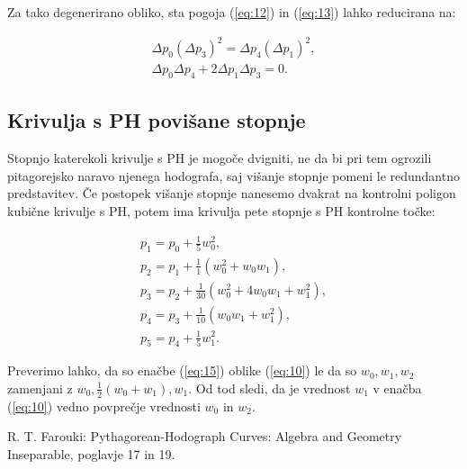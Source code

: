 \documentclass[a4paper]{IEEEtran}
\begin{document}
	Za tako degenerirano obliko, sta pogoja (\ref{eq:12}) in (\ref{eq:13}) lahko reducirana na:
	
	\begin{eqnarray}
	\Delta p_0(\Delta p_3)^2 =\Delta p_4(\Delta p_1)^2,\nonumber \\
	\Delta p_0 \Delta p_4 + 2\Delta p_1 \Delta p_3 = 0.\nonumber
	\end{eqnarray}
	
	\subsection{Krivulja s PH povišane stopnje}
	Stopnjo katerekoli krivulje s PH je mogoče dvigniti, ne da bi pri tem ogrozili pitagorejsko naravo njenega hodografa, saj višanje stopnje pomeni le redundantno predstavitev. Če postopek višanje stopnje nanesemo dvakrat na kontrolni poligon kubične krivulje s PH, potem ima krivulja pete stopnje s PH kontrolne točke:
	
	\begin{eqnarray}\label{eq:15}
	p_1 = p_0 +\frac{1}{5}w_0^2, \nonumber \\
	p_2 = p_1 +\frac{1}{1}(w_0^2+w_0w_1), \nonumber \\
	p_3 = p_2 +\frac{1}{30}(w_0^2+4w_0w_1+w_1^2), \nonumber \\
	p_4 = p_3 +\frac{1}{10}(w_0w_1+w_1^2), \nonumber \\
	p_5 = p_4 +\frac{1}{5}w_1^2.
	\end{eqnarray}
	
	Preverimo lahko, da so enačbe (\ref{eq:15}) oblike (\ref{eq:10}) le da so $w_0,w_1,w_2$ zamenjani z $w_0,\frac{1}{2}(w_0+w_1), w_1$. Od tod sledi, da je vrednost $w_1$ v enačba (\ref{eq:10}) vedno povprečje vrednosti $w_0$ in $w_2$. 
	
	\begin{thebibliography}{1}
		 R. T. Farouki: Pythagorean-Hodograph Curves: Algebra and Geometry Inseparable, poglavje 17 in 19.
	\end{thebibliography}
\end{document}
